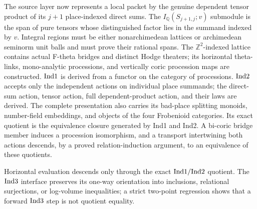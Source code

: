 \begin{definition}
  \leanok
  The source layer now represents a local packet by the genuine dependent
  tensor product of its \(j+1\) place-indexed direct sums.  The
  \(I_{\mathbb Q}(S_{j+1,j};v)\) submodule is the span of pure tensors whose
  distinguished factor lies in the summand indexed by \(v\).  Integral
  regions must be either nonarchimedean lattices or archimedean seminorm unit
  balls and must prove their rational spans.  The \(\mathbb Z^2\)-indexed
  lattice contains actual F-theta bridges and distinct Hodge theaters; its
  horizontal theta-links, mono-analytic processions, and vertically coric
  procession maps are constructed.  \(\mathrm{Ind1}\) is derived from a functor on
  the category of processions.  \(\mathrm{Ind2}\) accepts only the independent
  actions on individual place summands; the direct-sum action, tensor action,
  full dependent-product action, and their laws are derived.  The complete
  presentation also carries its bad-place splitting monoids, number-field
  embeddings, and objects of the four Frobenioid categories.  Its exact
  quotient is the equivalence closure generated by Ind1 and Ind2.  A bi-coric
  bridge member induces a procession isomorphism, and a transport intertwining
  both actions descends, by a proved relation-induction argument, to an
  equivalence of these quotients.

  Horizontal evaluation descends only through the exact \(\mathrm{Ind1}/\mathrm{Ind2}\)
  quotient.  The \(\mathrm{Ind3}\) interface preserves its one-way orientation into
  inclusions, relational surjections, or log-volume inequalities; a strict
  two-point regression shows that a forward \(\mathrm{Ind3}\) step is not quotient
  equality.


\end{definition}

